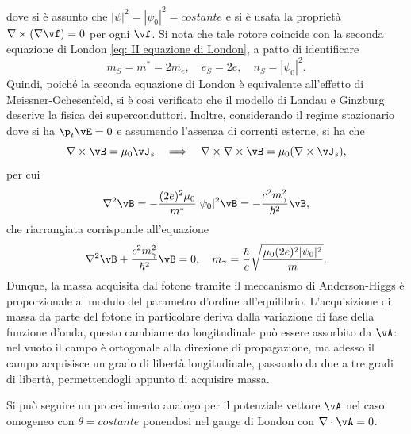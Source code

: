 dove si è assunto che $|\psi|^2 = |\psi_0|^2 = costante$ e si è usata la proprietà $\nabla \times (\nabla\vf) = 0$ per ogni $\vf$. Si nota che tale rotore coincide con la seconda equazione di London \eqref{eq: II equazione di London}, a patto di identificare
\begin{equation}
    m_S = m^* = 2m_e,\quad e_S = 2e,\quad n_S = |\psi_0|^2.
\end{equation}
Quindi, poiché la seconda equazione di London è equivalente all'effetto di Meissner-Ochesenfeld, si è così verificato che il modello di Landau e Ginzburg descrive la fisica dei superconduttori. Inoltre, considerando il regime stazionario dove si ha $\p_t\vE = 0$ e assumendo l'assenza di correnti esterne, si ha che
\begin{equation}
    \nabla \times \vB = \mu_0\vJ_s\quad \Longrightarrow\quad \nabla \times \nabla \times \vB = \mu_0(\nabla \times \vJ_s),
\end{equation}
per cui 
\begin{equation}
    \nabla^2\vB = -\frac{(2e)^2\mu_0}{m^*}|\psi_0|^2\vB = -\frac{c^2m_\gamma^2}{\hbar^2}\vB,
\end{equation}
che riarrangiata corrisponde all'equazione
\begin{equation}
    \nabla^2\vB + \frac{c^2m_\gamma^2}{\hbar^2}\vB = 0,\quad m_\gamma = \frac{\hbar}{c}\sqrt{\frac{\mu_0(2e)^2|\psi_0|^2}{m}}.
\end{equation}
Dunque, la massa acquisita dal fotone tramite il meccanismo di Anderson-Higgs è proporzionale al modulo del parametro d'ordine all'equilibrio. L'acquisizione di massa da parte del fotone in particolare deriva dalla variazione di fase della funzione d'onda, questo cambiamento longitudinale può essere assorbito da $\vA$: nel vuoto il campo è ortogonale alla direzione di propagazione, ma adesso il campo acquisisce un grado di libertà longitudinale, passando da due a tre gradi di libertà, permettendogli appunto di acquisire massa.
\begin{obs}
    Si può seguire un procedimento analogo per il potenziale vettore $\vA$ nel caso omogeneo con $\theta = costante$ ponendosi nel gauge di London con $\nabla \cdot \vA = 0$.
\end{obs}

